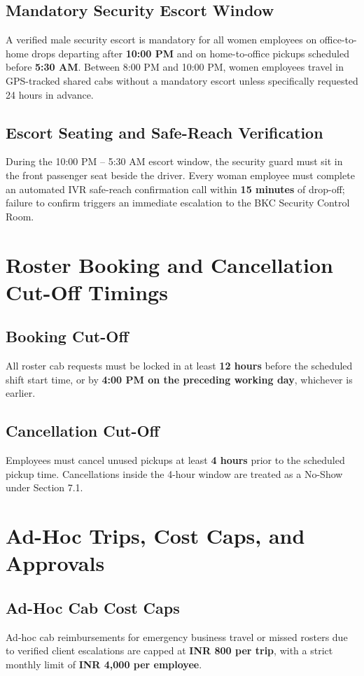\documentclass[11pt,a4paper]{article}
\begin{document}
\subsection{Mandatory Security Escort Window}
A verified male security escort is mandatory for all women employees on office-to-home drops departing after \textbf{10:00 PM} and on home-to-office pickups scheduled before \textbf{5:30 AM}. Between 8:00 PM and 10:00 PM, women employees travel in GPS-tracked shared cabs without a mandatory escort unless specifically requested 24 hours in advance.

\subsection{Escort Seating and Safe-Reach Verification}
During the 10:00 PM -- 5:30 AM escort window, the security guard must sit in the front passenger seat beside the driver. Every woman employee must complete an automated IVR safe-reach confirmation call within \textbf{15 minutes} of drop-off; failure to confirm triggers an immediate escalation to the BKC Security Control Room.

\section{Roster Booking and Cancellation Cut-Off Timings}
\subsection{Booking Cut-Off}
All roster cab requests must be locked in at least \textbf{12 hours} before the scheduled shift start time, or by \textbf{4:00 PM on the preceding working day}, whichever is earlier.

\subsection{Cancellation Cut-Off}
Employees must cancel unused pickups at least \textbf{4 hours} prior to the scheduled pickup time. Cancellations inside the 4-hour window are treated as a No-Show under Section 7.1.

\section{Ad-Hoc Trips, Cost Caps, and Approvals}
\subsection{Ad-Hoc Cab Cost Caps}
Ad-hoc cab reimbursements for emergency business travel or missed rosters due to verified client escalations are capped at \textbf{INR 800 per trip}, with a strict monthly limit of \textbf{INR 4,000 per employee}.
\end{document}
